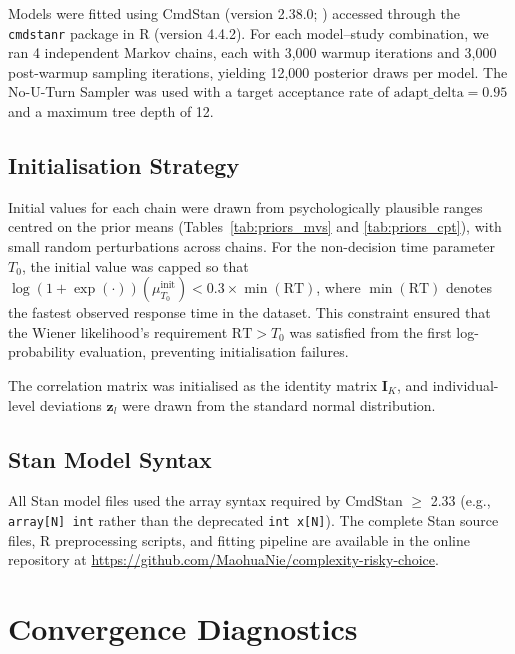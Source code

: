 \documentclass[man,floatsintext]{apa7}
\begin{document}
Models were fitted using CmdStan (version 2.38.0; \cite{stan_cmdstan_2024}) accessed through the \texttt{cmdstanr} package in R (version 4.4.2). For each model--study combination, we ran 4 independent Markov chains, each with 3,000 warmup iterations and 3,000 post-warmup sampling iterations, yielding 12,000 posterior draws per model. The No-U-Turn Sampler \parencite[NUTS;][]{hoffman_no-u-turn_2014} was used with a target acceptance rate of $\text{adapt\_delta} = 0.95$ and a maximum tree depth of 12.

\subsection{Initialisation Strategy}

Initial values for each chain were drawn from psychologically plausible ranges centred on the prior means (Tables~\ref{tab:priors_mvs} and \ref{tab:priors_cpt}), with small random perturbations across chains. For the non-decision time parameter $T_0$, the initial value was capped so that $\log(1+\exp(\cdot))(\mu_{T_0}^{\text{init}}) < 0.3 \times \min(\text{RT})$, where $\min(\text{RT})$ denotes the fastest observed response time in the dataset. This constraint ensured that the Wiener likelihood's requirement $\text{RT} > T_0$ was satisfied from the first log-probability evaluation, preventing initialisation failures.

The correlation matrix was initialised as the identity matrix $\mathbf{I}_K$, and individual-level deviations $\mathbf{z}_l$ were drawn from the standard normal distribution.

\subsection{Stan Model Syntax}

All Stan model files used the array syntax required by CmdStan $\geq$ 2.33 (e.g., \texttt{array[N] int} rather than the deprecated \texttt{int x[N]}). The complete Stan source files, R preprocessing scripts, and fitting pipeline are available in the online repository at \url{https://github.com/MaohuaNie/complexity-risky-choice}.

\section{Convergence Diagnostics}
\label{sec:convergence}
\end{document}
